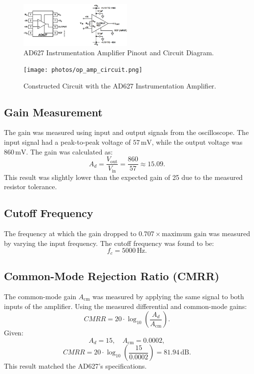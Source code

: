 \begin{figure}[H]
  \centering
  \includegraphics[width=0.5\textwidth]{photos/ad627_instrumentation_amplifier_pinout_and_diagram.png}
  \caption{AD627 Instrumentation Amplifier Pinout and Circuit Diagram.}
  \label{fig:ad627_diagram}
\end{figure}

\begin{figure}[H]
  \centering
  \texttt{[image: photos/op\_amp\_circuit.png]}
  \caption{Constructed Circuit with the AD627 Instrumentation Amplifier.}
  \label{fig:circuit}
\end{figure}

\subsection{Gain Measurement}
The gain was measured using input and output signals from the oscilloscope. The input signal had a peak-to-peak voltage of
\( 57 \, \text{mV} \), while the output voltage was \( 860 \, \text{mV} \). The gain was calculated as:
\[
  A_d = \frac{V_\text{out}}{V_\text{in}} = \frac{860}{57} \approx 15.09.
\]
This result was slightly lower than the expected gain of 25 due to the measured resistor tolerance.

\subsection{Cutoff Frequency}
The frequency at which the gain dropped to \( 0.707 \times \text{maximum gain} \) was measured by varying the input frequency.
The cutoff frequency was found to be:
\[
  f_c = 5000 \, \text{Hz}.
\]

\subsection{Common-Mode Rejection Ratio (CMRR)}
The common-mode gain \( A_\text{cm} \) was measured by applying the same signal to both inputs of the amplifier. Using the measured
differential and common-mode gains:
\[
  CMRR = 20 \cdot \log_{10}\left(\frac{A_d}{A_\text{cm}}\right).
\]
Given:
\[
  A_d = 15, \quad A_\text{cm} = 0.0002,
\]
\[
  CMRR = 20 \cdot \log_{10}\left(\frac{15}{0.0002}\right) = 81.94 \, \text{dB}.
\]
This result matched the AD627's specifications.

